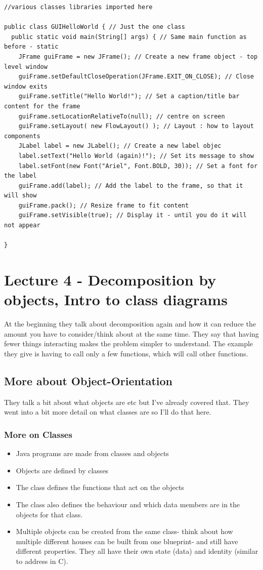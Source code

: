\documentclass{article}
\begin{document}
\begin{lstlisting}
//various classes libraries imported here

public class GUIHelloWorld { // Just the one class	
  public static void main(String[] args) { // Same main function as before - static
    JFrame guiFrame = new JFrame(); // Create a new frame object - top level window
    guiFrame.setDefaultCloseOperation(JFrame.EXIT_ON_CLOSE); // Close window exits
    guiFrame.setTitle("Hello World!"); // Set a caption/title bar content for the frame    	
    guiFrame.setLocationRelativeTo(null); // centre on screen
    guiFrame.setLayout( new FlowLayout() ); // Layout : how to layout components
    JLabel label = new JLabel(); // Create a new label objec
    label.setText("Hello World (again)!"); // Set its message to show
    label.setFont(new Font("Ariel", Font.BOLD, 30)); // Set a font for the label
    guiFrame.add(label); // Add the label to the frame, so that it will show
    guiFrame.pack(); // Resize frame to fit content
    guiFrame.setVisible(true); // Display it - until you do it will not appear
	
} 
\end{lstlisting}

\section{Lecture 4 - Decomposition by objects, Intro to class diagrams}

At the beginning they talk about decomposition again and how it can reduce the amount
you have to consider/think about at the same time. They say that having fewer things
interacting makes the problem simpler to understand. The example they give is having
to call only a few functions, which will call other functions.

\subsection{More about Object-Orientation}
They talk a bit about what objects are etc but I've already covered that. They went into
a bit more detail on what classes are so I'll do that here. 

\subsubsection{More on Classes}
\begin{itemize}
	\item Java programs are made from classes and objects
	\item Objects are defined by classes
	\item The class defines the functions that act on the objects
	\item The class also defines the behaviour and which data members are in 
	      the objects for that class.
	\item Multiple objects can be created from the same class- think about how multiple
	      different houses can be built from one blueprint- and still have different
	      properties. They all have their own state (data) and identity (similar to
	      address in C).
\end{itemize}
\end{document}
